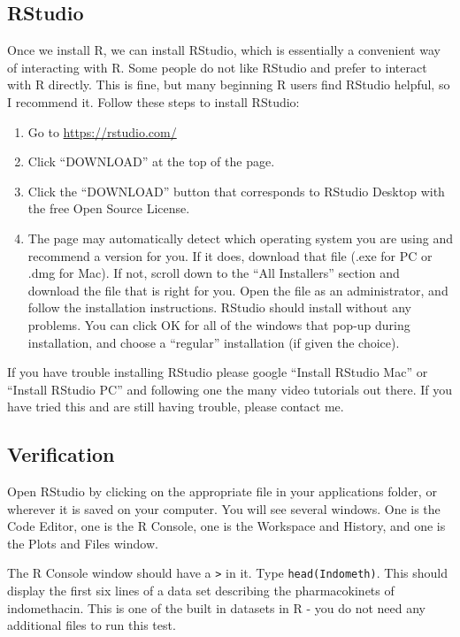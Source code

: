 \documentclass[
]{krantz}
\begin{document}
\hypertarget{rstudio}{%
\subsection{RStudio}\label{rstudio}}

Once we install R, we can install RStudio, which is essentially a convenient way of interacting with R. Some people do not like RStudio and prefer to interact with R directly. This is fine, but many beginning R users find RStudio helpful, so I recommend it. Follow these steps to install RStudio:

\begin{enumerate}
\def\labelenumi{\arabic{enumi}.}
\item
  Go to \url{https://rstudio.com/}
\item
  Click ``DOWNLOAD'' at the top of the page.
\item
  Click the ``DOWNLOAD'' button that corresponds to RStudio Desktop with the free Open Source License.
\item
  The page may automatically detect which operating system you are using and recommend a version for you. If it does, download that file (.exe for PC or .dmg for Mac). If not, scroll down to the ``All Installers'' section and download the file that is right for you. Open the file as an administrator, and follow the installation instructions. RStudio should install without any problems. You can click OK for all of the windows that pop-up during installation, and choose a ``regular'' installation (if given the choice).
\end{enumerate}

If you have trouble installing RStudio please google ``Install RStudio Mac'' or ``Install RStudio PC'' and following one the many video tutorials out there. If you have tried this and are still having trouble, please contact me.

\hypertarget{verification}{%
\subsection{Verification}\label{verification}}

Open RStudio by clicking on the appropriate file in your applications folder, or wherever it is saved on your computer. You will see several windows. One is the Code Editor, one is the R Console, one is the Workspace and History, and one is the Plots and Files window.

The R Console window should have a \texttt{\textgreater{}} in it. Type \texttt{head(Indometh)}. This should display the first six lines of a data set describing the pharmacokinets of indomethacin. This is one of the built in datasets in R - you do not need any additional files to run this test.
\end{document}
